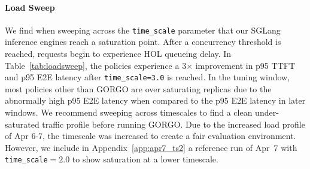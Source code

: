 \documentclass{article}
\begin{document}
\paragraph{Load Sweep}

We find when sweeping across the \texttt{time\_scale} parameter that our SGLang inference engines reach a saturation point. After a concurrency threshold is reached,
requests begin to experience HOL queueing delay. In Table~\ref{tab:loadsweep}, the policies experience a 3$\times$ improvement in p95 TTFT and p95 E2E latency after \texttt{time\_scale=3.0} is reached.
In the tuning window, most policies other than GORGO are over saturating replicas due to the abnormally high p95 E2E latency when compared to the p95 E2E latency in later windows.
We recommend sweeping across timescales to find a clean under-saturated traffic profile before running GORGO. Due to the increased load profile of Apr 6-7, the timescale was increased to create a fair evaluation environment. However, we include in Appendix~\ref{app:apr7_ts2} a reference run of Apr~7 with \texttt{time\_scale}${=}2.0$ to show saturation at a lower timescale.
\end{document}
